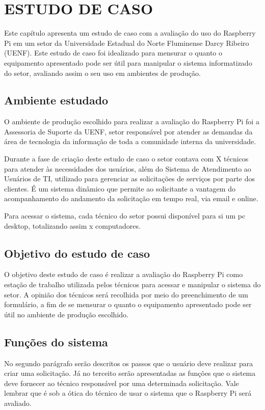 \chapter{ESTUDO DE CASO}

Este capítulo apresenta um estudo de caso com a avaliação do uso do Raspberry Pi em um setor da Universidade Estadual do Norte Fluminense Darcy Ribeiro (UENF). Este estudo de caso foi idealizado para mensurar o quanto o equipamento apresentado pode ser útil para manipular o sistema informatizado do setor, avaliando assim o seu uso em ambientes de produção.

\section{Ambiente estudado}

O ambiente de produção escolhido para realizar a avaliação do Raspberry Pi foi a Assessoria de Suporte da UENF, setor responsável por atender as demandas da área de tecnologia da informação de toda a comunidade interna da universidade.

Durante a fase de criação deste estudo de caso o setor contava com X técnicos para atender às necessidades dos usuários, além do Sistema de Atendimento ao Usuários de TI, utilizado para gerenciar as solicitações de serviços por parte dos clientes. É um sistema dinâmico que permite ao solicitante a vantagem do acompanhamento do andamento da solicitação em tempo real, via email e online.

Para acessar o sistema, cada técnico do setor possui disponível para si um pc desktop, totalizando assim x computadores.

\section{Objetivo do estudo de caso}

O objetivo deste estudo de caso é realizar a avaliação do Raspberry Pi como estação de trabalho utilizada pelos técnicos para acessar e manipular o sistema do setor. A opinião dos técnicos será recolhida por meio do preenchimento de um formulário, a fim de se mensurar o quanto o equipamento apresentado pode ser útil no ambiente de produção escolhido.

\section{Funções do sistema}

No segundo parágrafo serão descritos os passos que o usuário deve realizar para criar uma solicitação. Já no terceito serão apresentadas as funções que o sistema deve fornecer ao técnico responsável por uma determinada solicitação. Vale lembrar que é sob a ótica do técnico de usar o sistema que o Raspberry Pi será avaliado.

